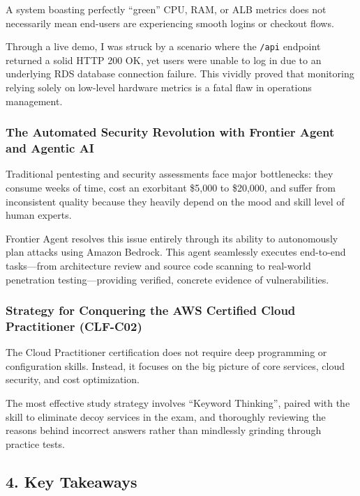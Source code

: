 A system boasting perfectly ``green'' CPU, RAM, or ALB metrics does not
necessarily mean end-users are experiencing smooth logins or checkout
flows.

Through a live demo, I was struck by a scenario where the \texttt{/api}
endpoint returned a solid HTTP 200 OK, yet users were unable to log in
due to an underlying RDS database connection failure. This vividly
proved that monitoring relying solely on low-level hardware metrics is a
fatal flaw in operations management.

\hypertarget{the-automated-security-revolution-with-frontier-agent-and-agentic-ai}{%
\subsubsection{The Automated Security Revolution with Frontier Agent and
Agentic
AI}}

Traditional pentesting and security assessments face major bottlenecks:
they consume weeks of time, cost an exorbitant \$5,000 to \$20,000, and
suffer from inconsistent quality because they heavily depend on the mood
and skill level of human experts.

Frontier Agent resolves this issue entirely through its ability to
autonomously plan attacks using Amazon Bedrock. This agent seamlessly
executes end-to-end tasks---from architecture review and source code
scanning to real-world penetration testing---providing verified,
concrete evidence of vulnerabilities.

\hypertarget{strategy-for-conquering-the-aws-certified-cloud-practitioner-clf-c02}{%
\subsubsection{Strategy for Conquering the AWS Certified Cloud
Practitioner
(CLF-C02)}}

The Cloud Practitioner certification does not require deep programming
or configuration skills. Instead, it focuses on the big picture of core
services, cloud security, and cost optimization.

The most effective study strategy involves ``Keyword Thinking'', paired
with the skill to eliminate decoy services in the exam, and thoroughly
reviewing the reasons behind incorrect answers rather than mindlessly
grinding through practice tests.

\hypertarget{key-takeaways}{%
\subsection{4. Key Takeaways}}

